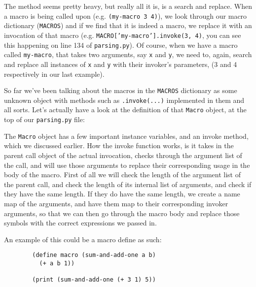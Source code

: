 \documentclass{article}
\newcommand{\code}[1]{\texttt{#1}}
\begin{document}
      The method seems pretty heavy, but really all it is, is a search and replace.
      When a macro is being called upon (e.g. \code{(my-macro 3 4)}), we look through
      our macro dictionary (\code{MACROS}) and if we find that it is indeed a macro,
      we replace it with an invocation of that macro (e.g.
      \code{MACRO['my-macro'].invoke(3, 4)}, you can see this happening on line
      134 of \code{parsing.py}).  Of course, when we have a macro called
      \code{my-macro}, that takes two arguments, say \code{x} and \code{y}, we
      need to, again, search and replace all instances of \code{x} and \code{y}
      with their invoker's parameters, (3 and 4 respectively in our last example).

      So far we've been talking about the macros in the \code{MACROS} dictionary
      as some unknown object with methods such as \code{.invoke(...)} implemented
      in them and all sorts. Let's actually have a look at the definition of that
      \code{Macro} object, at the top of our \code{parsing.py} file:

      The \code{Macro} object has a few important instance variables, and an
      invoke method, which we discussed earlier. How the invoke function works,
      is it takes in the parent call object of the actual invocation, checks through
      the argument list of the call, and will use those arguments to replace their
      corresponding usage in the body of the macro.  First of all we will check
      the length of the argument list of the parent call, and check the length of
      its internal list of arguments, and check if they have the same length.
      If they do have the same length, we create a name map of the arguments, and
      have them map to their corresponding invoker arguments, so that we can then
      go through the macro body and replace those symbols with the correct expressions
      we passed in.

      An example of this could be a macro define as such:

      \begin{verbatim}
        (define macro (sum-and-add-one a b)
          (+ a b 1))

        (print (sum-and-add-one (+ 3 1) 5))
      \end{verbatim}
\end{document}
